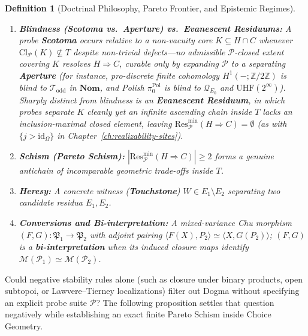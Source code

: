 \documentclass[10pt,twoside,openright]{book}
\theoremstyle{crmplain}
\theoremstyle{crmdef}
\newtheorem{definition}[theorem]{Definition}
\theoremstyle{crmremark}
\begin{document}
\begin{definition}[Doctrinal Philosophy, Pareto Frontier, and Epistemic Regimes]
\begin{enumerate}[label=\textup{(\arabic*)},leftmargin=2.0em]
  \item \textbf{Blindness (Scotoma vs.\ Aperture) vs.\ Evanescent Residuums:} A probe \textbf{Scotoma} occurs relative to a non-vacuity core $K \subseteq H \cap C$ whenever $\mathrm{Cl}_{\mathcal{P}}(K) \not\subseteq T$ despite non-trivial defects---no admissible $\mathcal{P}$-closed extent covering $K$ resolves $H \Rightarrow C$, curable only by expanding $\mathcal{P}$ to a separating \textbf{Aperture} (for instance, pro-discrete finite cohomology $H^1(-;\mathbb{Z}/2\mathbb{Z})$ is blind to $\mathcal{T}_{\mathrm{odd}}$ in $\mathbf{Nom}$, and Polish $\pi_0^{\mathrm{Pol}}$ is blind to $\mathcal{Q}_{E_0}$ and $\mathrm{UHF}(2^\infty)$). Sharply distinct from blindness is an \textbf{Evanescent Residuum}, in which probes separate $K$ cleanly yet an infinite ascending chain inside $T$ lacks an inclusion-maximal closed element, leaving $\mathrm{Res}_{\mathcal{P}}^{\min}(H \Rightarrow C) = \emptyset$ (as with $\{j > \mathrm{id}_\Omega\}$ in Chapter~\ref{ch:realizability-sites}).
  \item \textbf{Schism (Pareto Schism):} $|\mathrm{Res}_{\mathcal{P}}^{\min}(H \Rightarrow C)| \ge 2$ forms a genuine antichain of incomparable geometric trade-offs inside $T$.
  \item \textbf{Heresy:} A concrete witness (\textbf{Touchstone}) $W \in E_1 \setminus E_2$ separating two candidate residua $E_1, E_2$.
  \item \textbf{Conversions and Bi-interpretation:} A mixed-variance Chu morphism~\cite{Shulman20} $(F, G) : \mathfrak{P}_1 \to \mathfrak{P}_2$ with adjoint pairing $\langle F(X), P_2 \rangle \simeq \langle X, G(P_2) \rangle$; $(F, G)$ is a \textbf{bi-interpretation} when its induced closure maps identify $\mathcal{M}(\mathcal{P}_1) \simeq \mathcal{M}(\mathcal{P}_2)$.
\end{enumerate}
\end{definition}

Could negative stability rules alone (such as closure under binary products, open subtopoi, or Lawvere--Tierney localizations) filter out Dogma without specifying an explicit probe suite $\mathcal{P}$? The following proposition settles that question negatively while establishing an exact finite Pareto Schism inside Choice Geometry.
\end{document}

